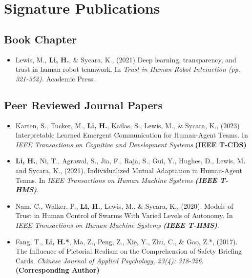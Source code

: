 \documentclass[10pt,letterpaper,roman]{moderncv}        %
\begin{document}
\section{Signature Publications}


\subsection{Book Chapter}
\begin{itemize}

\item{Lewis, M., \textbf{Li, H.},  \& Sycara, K., (2021) Deep learning, transparency, and trust in human robot teamwork. In \textit{Trust in Human-Robot Interaction (pp. 321-352).} Academic Press. }


\end{itemize}
\subsection{Peer Reviewed Journal Papers}
\begin{itemize}

\item{Karten, S., Tucker, M., \textbf{Li, H.},  Kailas, S., Lewis, M., \& Sycara, K., (2023) Interpretable Learned Emergent Communication for Human-Agent Teams. In \textit{IEEE Transactions on Cognitive and Development Systems} \textbf{(IEEE T-CDS)}}

\item{\textbf{Li, H.}, Ni, T., Agrawal, S., Jia, F., Raja, S., Gui, Y., Hughes, D., Lewis, M. and Sycara, K., (2021). Individualized Mutual Adaptation in Human-Agent Teams.  In \textit{IEEE Transactions on Human Machine Systems \textbf{(IEEE T-HMS)}}. }


\item{Nam, C.,  Walker, P., \textbf{Li, H.}, Lewis, M., \& Sycara, K., (2020). Models of Trust in Human Control of Swarms With Varied Levels of Autonomy. In \textit{IEEE Transactions on Human-Machine Systems \textbf{(IEEE T-HMS)}}.}



\item{ Fang, T., \textbf{Li, H.*}, Ma, Z., Peng, Z.,  Xie, Y., Zhu, C., \& Gao, Z.*, (2017). The Influence of Pictorial Realism on the Comprehension of Safety Briefing Cards. \textit{Chinese Journal of Applied Psychology, 23(4): 318-326}. \textbf{(Corresponding Author)}}



\end{itemize}
\end{document}
